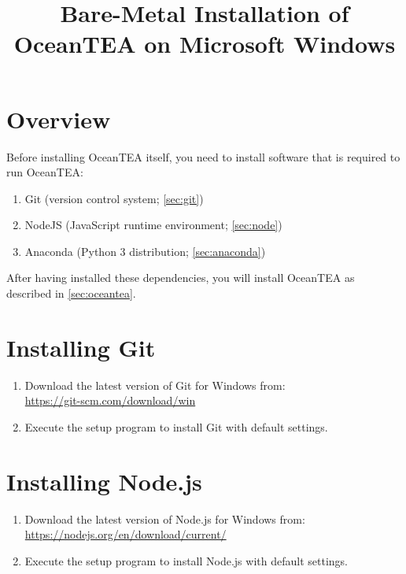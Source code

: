 \documentclass[11pt,a4paper,english,oneside,parskip=false]{scrartcl} %
\begin{document}
\title{Bare\hyp{}Metal Installation of OceanTEA on Microsoft Windows}
\date{}

\maketitle

\section{Overview}

Before installing OceanTEA itself, you need to install software that is required to run OceanTEA: 
\begin{enumerate}
	\item Git (version control system; \autoref{sec:git})
	\item NodeJS (JavaScript runtime environment; \autoref{sec:node})
	\item Anaconda (Python 3 distribution; \autoref{sec:anaconda})
\end{enumerate}
After having installed these dependencies, you will install OceanTEA as described in \autoref{sec:oceantea}. 



\section{Installing Git} \label{sec:git}

\begin{enumerate}
	\item Download the latest version of Git for Windows from:\\ \url{https://git-scm.com/download/win}
	\item Execute the setup program to install Git with default settings. 
\end{enumerate}



\section{Installing Node.js} \label{sec:node}

\begin{enumerate}
	\item Download the latest version of Node.js for Windows from:\\
	\url{https://nodejs.org/en/download/current/}
	\item Execute the setup program to install Node.js with default settings. 
\end{enumerate}
\end{document}
